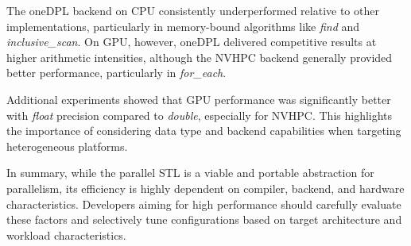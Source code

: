 \documentclass[sigconf]{acmart}
\begin{document}
The oneDPL backend on CPU consistently underperformed relative to other
implementations, particularly in memory-bound algorithms like \textit{find} and
\textit{inclusive\_scan}. On GPU, however, oneDPL delivered competitive results
at higher arithmetic intensities, although the NVHPC backend generally provided
better performance, particularly in \textit{for\_each}.

Additional experiments showed that GPU performance was significantly better
with \textit{float} precision compared to \textit{double}, especially for
NVHPC. This highlights the importance of considering data type and backend
capabilities when targeting heterogeneous platforms.

In summary, while the parallel STL is a viable and portable abstraction for
parallelism, its efficiency is highly dependent on compiler, backend, and
hardware characteristics. Developers aiming for high performance should
carefully evaluate these factors and selectively tune configurations based on
target architecture and workload characteristics.
\end{document}

